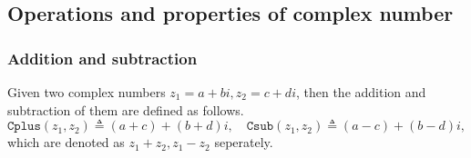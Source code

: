 \documentclass[runningheads]{llncs}
\begin{document}
\subsection{Operations and properties of complex number}

\subsubsection{Addition and subtraction}
Given two complex numbers $z_1=a+bi, z_2=c+di$, then the addition and subtraction of them are defined as follows.
\begin{equation}
  \mathtt{Cplus}(z_1,z_2)\triangleq (a+c)+(b+d)i,\quad
  \mathtt{Csub}(z_1,z_2)\triangleq (a-c)+(b-d)i,
\end{equation}
which are denoted as $z_1+z_2, z_1-z_2$ seperately.
  
\end{document}
